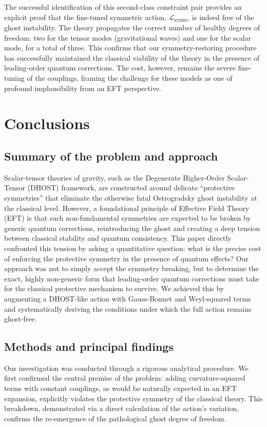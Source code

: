\documentclass[twocolumn]{aastex631}
\begin{document}
The successful identification of this second-class constraint pair provides an explicit proof that the fine-tuned symmetric action, $\mathcal{L}_{\text{symm}}$, is indeed free of the ghost instability. The theory propagates the correct number of healthy degrees of freedom: two for the tensor modes (gravitational waves) and one for the scalar mode, for a total of three. This confirms that our symmetry-restoring procedure has successfully maintained the classical viability of the theory in the presence of leading-order quantum corrections. The cost, however, remains the severe fine-tuning of the couplings, framing the challenge for these models as one of profound implausibility from an EFT perspective.

\section{Conclusions}
\label{sec:conclusions}
\subsection{Summary of the problem and approach}
Scalar-tensor theories of gravity, such as the Degenerate Higher-Order Scalar-Tensor (DHOST) framework, are constructed around delicate ``protective symmetries'' that eliminate the otherwise fatal Ostrogradsky ghost instability at the classical level. However, a foundational principle of Effective Field Theory (EFT) is that such non-fundamental symmetries are expected to be broken by generic quantum corrections, reintroducing the ghost and creating a deep tension between classical stability and quantum consistency. This paper directly confronted this tension by asking a quantitative question: what is the precise cost of enforcing the protective symmetry in the presence of quantum effects? Our approach was not to simply accept the symmetry breaking, but to determine the exact, highly non-generic form that leading-order quantum corrections must take for the classical protective mechanism to survive. We achieved this by augmenting a DHOST-like action with Gauss-Bonnet and Weyl-squared terms and systematically deriving the conditions under which the full action remains ghost-free.

\subsection{Methods and principal findings}
Our investigation was conducted through a rigorous analytical procedure. We first confirmed the central premise of the problem: adding curvature-squared terms with constant couplings, as would be naturally expected in an EFT expansion, explicitly violates the protective symmetry of the classical theory. This breakdown, demonstrated via a direct calculation of the action's variation, confirms the re-emergence of the pathological ghost degree of freedom.
\end{document}
